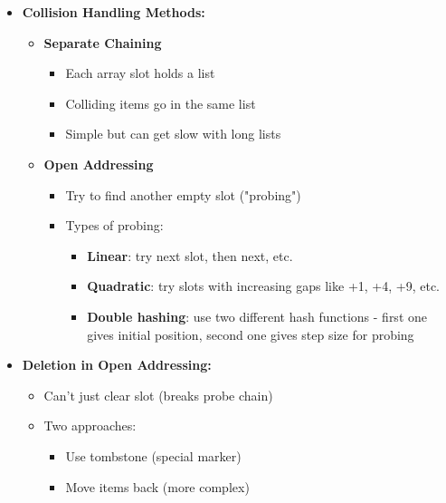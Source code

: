 \documentclass[11pt,a4paper]{article}
\begin{document}
\begin{multicols}{2}
\begin{itemize}
    \item \textbf{Collision Handling Methods:}
    \begin{itemize}
        \item \textbf{Separate Chaining}
        \begin{itemize}
            \item Each array slot holds a list
            \item Colliding items go in the same list
            \item Simple but can get slow with long lists
        \end{itemize}
        \item \textbf{Open Addressing}
        \begin{itemize}
            \item Try to find another empty slot ("probing")
            \item Types of probing:
            \begin{itemize}
                \item \textbf{Linear}: try next slot, then next, etc.
                \item \textbf{Quadratic}: try slots with increasing gaps like +1, +4, +9, etc.
                \item \textbf{Double hashing}: use two different hash functions - first one gives initial position, second one gives step size for probing
            \end{itemize}
        \end{itemize}
    \end{itemize}

    \item \textbf{Deletion in Open Addressing:}
    \begin{itemize}
        \item Can't just clear slot (breaks probe chain)
        \item Two approaches:
        \begin{itemize}
            \item Use tombstone (special marker)
            \item Move items back (more complex)
        \end{itemize}
    \end{itemize}


\end{itemize}
\end{multicols}
\end{document}
